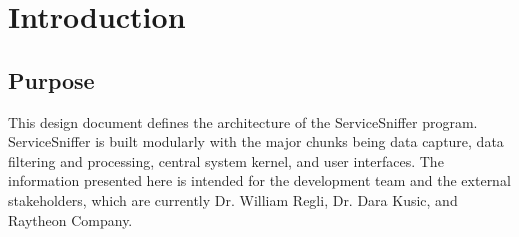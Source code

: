 \documentclass[titlepage]{article}
\begin{document}
\section{Introduction
    \label{introduction}
}
% 
% 
% 


\subsection{Purpose
    \label{purpose}
}

This design document defines the architecture of the ServiceSniffer program.
ServiceSniffer is built modularly with the major chunks being data capture,
data filtering and processing, central system kernel, and user interfaces.  The
information presented here is intended for the development team and the
external stakeholders, which are currently Dr. William Regli, Dr.  Dara Kusic,
and Raytheon Company.
\end{document}
